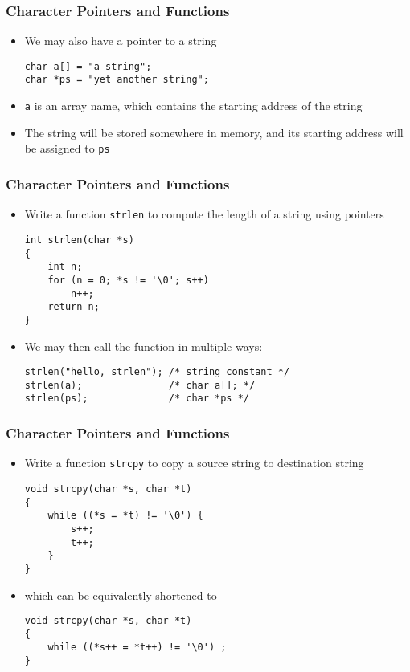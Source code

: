 \documentclass[11pt]{beamer}
\begin{document}
\begin{frame}[fragile]\frametitle{Character Pointers and Functions}
\label{sec-1-7}

\begin{itemize}
\item We may also have a pointer to a string

\begin{verbatim}
char a[] = "a string";
char *ps = "yet another string";
\end{verbatim}
\item \verb~a~ is an array name, which contains the starting address of the string
\item The string will be stored somewhere in memory, and its starting address will be assigned to \verb~ps~
\end{itemize}
\end{frame}
\begin{frame}[fragile]\frametitle{Character Pointers and Functions}
\label{sec-1-8}

\begin{itemize}
\item Write a function \verb~strlen~ to compute the length of a string using pointers

\begin{verbatim}
int strlen(char *s)
{
    int n;
    for (n = 0; *s != '\0'; s++)
        n++;
    return n;
}
\end{verbatim}
\item We may then call the function in multiple ways:

\begin{verbatim}
strlen("hello, strlen"); /* string constant */
strlen(a);               /* char a[]; */
strlen(ps);              /* char *ps */
\end{verbatim}
\end{itemize}
\end{frame}
\begin{frame}[fragile]\frametitle{Character Pointers and Functions}
\label{sec-1-9}

\begin{itemize}
\item Write a function \verb~strcpy~ to copy a source string to destination string

\begin{verbatim}
void strcpy(char *s, char *t)
{
    while ((*s = *t) != '\0') {
        s++;
        t++;
    }
}
\end{verbatim}
\item which can be equivalently shortened to

\begin{verbatim}
void strcpy(char *s, char *t)
{
    while ((*s++ = *t++) != '\0') ;
}
\end{verbatim}
\end{itemize}
\end{frame}
\end{document}
